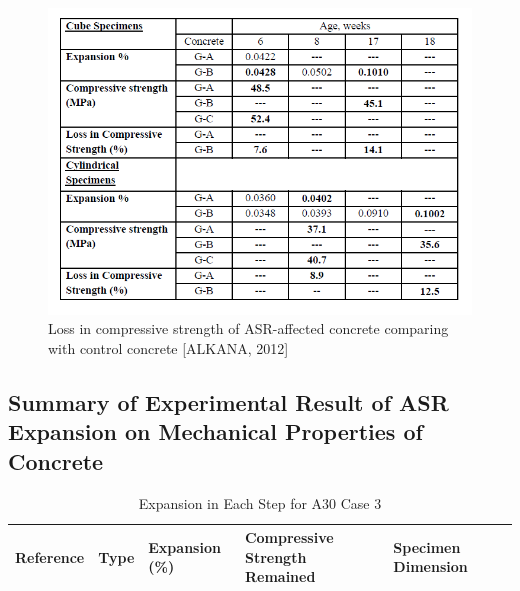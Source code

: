 \begin{figure}[h!]
  \centering
  \includegraphics[width=1.0\linewidth]{Reference/ALKANASR3.png}
  \caption{Loss in compressive strength of ASR-affected concrete comparing with control concrete [ALKANA, 2012]}
  \label{ALKANA3}
\end{figure}

\clearpage
\subsection{Summary of Experimental Result of ASR Expansion on Mechanical Properties of Concrete}

%
%
%
%


\begin{table}[ht!]
\centering
\begin{tabular}{  ||p{2.2cm}|p{2.2cm}|p{2.2cm}|p{2.2cm}|p{2.2cm}|p{2.2cm}|| }
\hline
 Reference & Type & Expansion (\%) & Compressive Strength Remained & Specimen Dimension \\
 \hline\hline

  \hline
  \end{tabular}
\caption{Expansion in Each Step for A30 Case 3}
\label{table:A30X0C_3_EXP}
\end{table}
